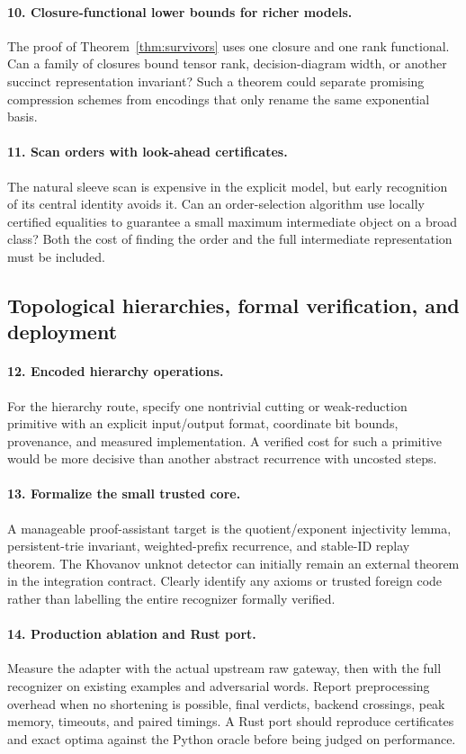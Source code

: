 \documentclass[11pt]{article}
\theoremstyle{definition}
\theoremstyle{remark}
\begin{document}
\paragraph{10. Closure-functional lower bounds for richer models.}
The proof of Theorem~\ref{thm:survivors} uses one closure and one rank
functional. Can a family of closures bound tensor rank, decision-diagram
width, or another succinct representation invariant? Such a theorem could
separate promising compression schemes from encodings that only rename
the same exponential basis.

\paragraph{11. Scan orders with look-ahead certificates.}
The natural sleeve scan is expensive in the explicit model, but early
recognition of its central identity avoids it. Can an order-selection
algorithm use locally certified equalities to guarantee a small maximum
intermediate object on a broad class? Both the cost of finding the order
and the full intermediate representation must be included.

\subsection{Topological hierarchies, formal verification, and deployment}
\paragraph{12. Encoded hierarchy operations.}
For the hierarchy route, specify one nontrivial cutting or weak-reduction
primitive with an explicit input/output format, coordinate bit bounds,
provenance, and measured implementation. A verified cost for such a
primitive would be more decisive than another abstract recurrence with
uncosted steps.

\paragraph{13. Formalize the small trusted core.}
A manageable proof-assistant target is the quotient/exponent injectivity
lemma, persistent-trie invariant, weighted-prefix recurrence, and stable-ID
replay theorem. The Khovanov unknot detector can initially remain an
external theorem in the integration contract. Clearly identify any axioms
or trusted foreign code rather than labelling the entire recognizer
formally verified.

\paragraph{14. Production ablation and Rust port.}
Measure the adapter with the actual upstream raw gateway, then with the
full recognizer on existing examples and adversarial words. Report
preprocessing overhead when no shortening is possible, final verdicts,
backend crossings, peak memory, timeouts, and paired timings. A Rust port
should reproduce certificates and exact optima against the Python oracle
before being judged on performance.
\end{document}
